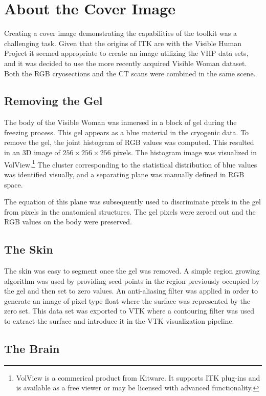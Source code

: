 \section*{About the Cover Image}

Creating a cover image demonstrating the capabilities of the toolkit was a
challenging task. Given that the origins of ITK are with the Visible Human
Project it seemed appropriate to create an image utilizing the VHP data sets,
and it was decided to use the more recently acquired Visible Woman dataset.
Both the RGB cryosections and the CT scans were combined in the same scene.

\subsection*{Removing the Gel}

The body of the Visible Woman was inmersed in a block of gel during the
freezing process. This gel appears as a blue material in the cryogenic data.
To remove the gel, the joint histogram of RGB values was computed. This
resulted in an 3D image of $256\times256\times256$ pixels. The histogram
image was visualized in VolView.\footnote{VolView is a commerical product
from Kitware. It supports ITK plug-ins and is available as a free viewer or
may be licensed with advanced functionality.} The cluster corresponding to the
statistical distribution of blue values was identified visually, and a
separating plane was manually defined in RGB space.

The equation of this plane was subsequently used to discriminate pixels in
the gel from pixels in the anatomical structures. The gel pixels were zeroed
out and the RGB values on the body were preserved.

\subsection*{The Skin}

The skin was easy to segment once the gel was removed. A simple region
growing algorithm was used by providing seed points in the region previously
occupied by the gel and then set to zero values. An anti-aliasing filter was
applied in order to generate an image of pixel type float where the surface
was represented by the zero set. This data set was exported to VTK where a
contouring filter was used to extract the surface and introduce it in the VTK
visualization pipeline.

\subsection*{The Brain}

